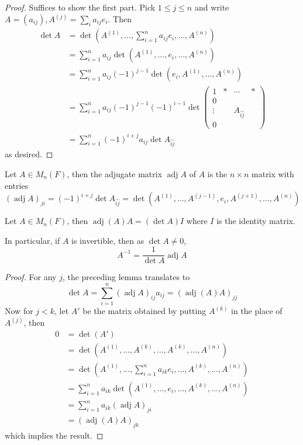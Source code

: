 \begin{proof}
    Suffices to show the first part.
    Pick $1\le j\le n$ and write $A=(a_{ij}),A^{(j)}=\sum_ia_{ij}e_i$.
    Then
    \begin{align*}
        \det A&=\det\left( A^{(1)},\ldots,\sum_{i=1}^na_{ij}e_i ,\ldots, A^{(n)}\right)\\
        &=\sum_{i=1}^na_{ij}\det(A^{(1)},\ldots,e_i,\ldots,A^{(n)})\\
        &=\sum_{i=1}^na_{ij}(-1)^{j-1}\det(e_i,A^{(1)},\ldots,A^{(n)})\\
        &=\sum_{i=1}^na_{ij}(-1)^{j-1}(-1)^{i-1}\det
        \begin{pmatrix}
            1&\ast&\cdots&\ast\\
            0&&&\\
            \vdots&&A_{\widehat{ij}}&\\
            0&&&
        \end{pmatrix}\\
        &=\sum_{i=1}^n(-1)^{i+j}a_{ij}\det A_{\widehat{ij}}
    \end{align*}
    as desired.
\end{proof}
\begin{definition}
    Let $A\in M_n(F)$, then the adjugate matrix $\operatorname{adj}A$ of $A$ is the $n\times n$ matrix with entries
    $$(\operatorname{adj}A)_{ji}=(-1)^{i+j}\det A_{\widehat{ij}}=\det(A^{(1)},\ldots,A^{(j-1)},e_i,A^{(j+1)},\ldots,A^{(n)})$$
\end{definition}
\begin{theorem}
    Let $A\in M_n(F)$, then $\operatorname{adj}(A)A=(\det A)I$ where $I$ is the identity matrix.
\end{theorem}
In particular, if $A$ is invertible, then as $\det A\neq 0$,
$$A^{-1}=\frac{1}{\det A}\operatorname{adj}A$$
\begin{proof}
    For any $j$, the preceding lemma translates to
    $$\det A=\sum_{i=1}^n(\operatorname{adj}A)_{ij}a_{ij}=(\operatorname{adj}(A)A)_{jj}$$
    Now for $j<k$, let $A'$ be the matrix obtained by putting $A^{(k)}$ in the place of $A^{(j)}$, then
    \begin{align*}
        0&=\det(A')\\
        &=\det(A^{(1)},\ldots,A^{(k)},\ldots,A^{(k)},\ldots,A^{(n)})\\
        &=\det\left(A^{(1)},\ldots,\sum_{i=1}^na_{ik}e_i,\ldots,A^{(k)},\ldots,A^{(n)}\right)\\
        &=\sum_{i=1}^na_{ik}\det(A^{(1)},\ldots,e_i,\ldots,A^{(k)},\ldots,A^{(n)})\\
        &=\sum_{i=1}^na_{ik}(\operatorname{adj}A)_{ji}\\
        &=(\operatorname{adj}(A)A)_{jk}
    \end{align*}
    which implies the result.
\end{proof}
